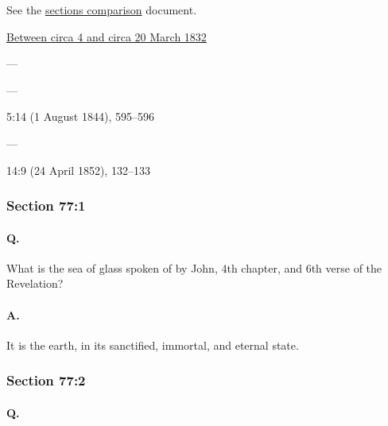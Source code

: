 		See the \href{https://drive.google.com/file/d/1goAvNz8jS4R8slYfMG_db55Ty2z_vmgK/view?usp=sharing}{sections comparison} document.
	
		\begin{compactdesc}
			\item[JSP] \hyperref[EMS-1832-JS-CIR-4-MAR-1832]{Between circa 4 and circa 20 March 1832}
			\item[BC] ---
			\item[DC 1835] ---
			\item[TS] 5:14 (1 August 1844), 595--596
			\item[DC 1844] ---
			\item[MS] 14:9 (24 April 1852), 132--133
		\end{compactdesc}

	\subsubsection{Section 77:1} %
		\label{DC77-1}

		\paragraph{Q.}

			What is the sea of glass spoken of by John, 4th chapter, and 6th verse of the 	Revelation?

		\paragraph{A.}
		
			 It is the earth, in its sanctified, immortal, and eternal state.


	\subsubsection{Section 77:2} %
		\label{DC77-2}

		\paragraph{Q.}

